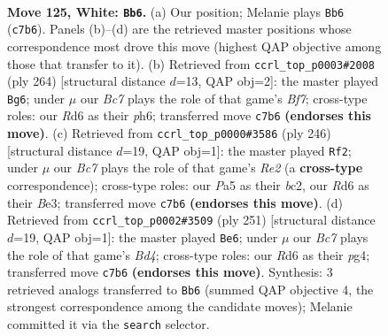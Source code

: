 \documentclass[11pt]{article}
\begin{document}
\clearpage

\begin{figure}[p]\centering
\begin{subfigure}{0.46\textwidth}\centering
\resizebox{\linewidth}{!}{%
\newchessgame
\chessboard[
  setfen={7r/2B4k/3R4/P4K2/8/8/8/8 w - - 19 125},
  showmover=false,
  pgfstyle=straightmove, color=movearrow, markmove={c7-b6}
]}
\caption{}
\end{subfigure}\hfill
\begin{subfigure}{0.46\textwidth}\centering
\resizebox{\linewidth}{!}{%
\newchessgame
\chessboard[
  setfen={8/5B2/7p/7P/3r1k2/8/4K3/8 w - - 43 133},
  showmover=false,
  pgfstyle=straightmove, color=movearrow, markmove={f7-g6}
]}
\caption{}
\end{subfigure}
\\[4pt]
\begin{subfigure}{0.46\textwidth}\centering
\resizebox{\linewidth}{!}{%
\newchessgame
\chessboard[
  setfen={2r5/1k6/7P/3K4/8/4B3/2b1R3/8 w - - 13 124},
  showmover=false,
  pgfstyle=straightmove, color=movearrow, markmove={e2-f2}
]}
\caption{}
\end{subfigure}\hfill
\begin{subfigure}{0.46\textwidth}\centering
\resizebox{\linewidth}{!}{%
\newchessgame
\chessboard[
  setfen={1R6/5pk1/8/3b4/6PK/8/8/8 b - - 26 126},
  showmover=false,
  pgfstyle=straightmove, color=movearrow, markmove={d5-e6}
]}
\caption{}
\end{subfigure}
\caption{\textbf{Move 125, White: \texttt{Bb6}.} (a) Our position; Melanie plays \texttt{Bb6} (\texttt{c7b6}). Panels (b)--(d) are the retrieved master positions whose correspondence most drove this move (highest QAP objective among those that transfer to it). (b) Retrieved from \texttt{ccrl\_top\_p0003\#2008} (ply 264) [structural distance $d$=13, QAP obj=2]: the master played \texttt{Bg6}; under $\mu$ our \emph{Bc7} plays the role of that game's \emph{Bf7}; cross-type roles: our \emph{R}d6 as their \emph{p}h6; transferred move \texttt{c7b6} \textbf{(endorses this move)}. (c) Retrieved from \texttt{ccrl\_top\_p0000\#3586} (ply 246) [structural distance $d$=19, QAP obj=1]: the master played \texttt{Rf2}; under $\mu$ our \emph{Bc7} plays the role of that game's \emph{Re2} (a \textbf{cross-type} correspondence); cross-type roles: our \emph{P}a5 as their \emph{b}c2, our \emph{R}d6 as their \emph{B}e3; transferred move \texttt{c7b6} \textbf{(endorses this move)}. (d) Retrieved from \texttt{ccrl\_top\_p0002\#3509} (ply 251) [structural distance $d$=19, QAP obj=1]: the master played \texttt{Be6}; under $\mu$ our \emph{Bc7} plays the role of that game's \emph{Bd4}; cross-type roles: our \emph{R}d6 as their \emph{p}g4; transferred move \texttt{c7b6} \textbf{(endorses this move)}. Synthesis: 3 retrieved analogs transferred to \texttt{Bb6} (summed QAP objective 4, the strongest correspondence among the candidate moves); Melanie committed it via the \texttt{search} selector.}
\label{fig:thought-m248}
\end{figure}
\end{document}
